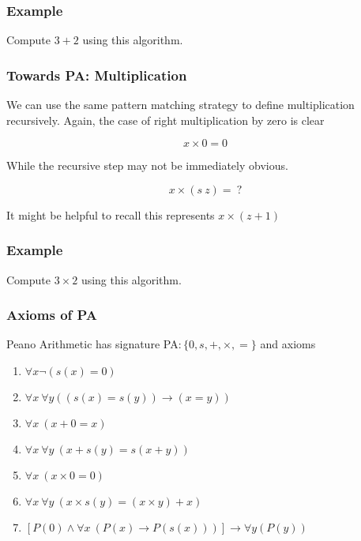 \documentclass{beamer}
\theoremstyle{indentDefn} \newtheorem{defn}[]{Definition}
\begin{document}
\begin{frame}
	\frametitle{Example}

	Compute $3 + 2$ using this algorithm. 

	\vspace{6cm}

\end{frame}

\begin{frame}
	\frametitle{Towards PA: Multiplication}

	We can use the same pattern matching strategy to define multiplication recursively. Again, the case of right multiplication by zero is clear

	$$x \times 0 = 0$$

	While the recursive step may not be immediately obvious.

	$$x \times (s \ z) = \ ?$$

	It might be helpful to recall this represents $x \times (z + 1)$

	\vspace{2cm}

\end{frame}

\begin{frame}
	\frametitle{Example}

	Compute $3 \times 2$ using this algorithm. 

	\vspace{6cm}

\end{frame} 

\begin{frame}
	\frametitle{Axioms of PA}
	
	Peano Arithmetic has signature PA$: \{0, s, +, \times, =\}$ and axioms
	
	\begin{enumerate}
		\item $\forall x \lnot(s(x) = 0)$
		\item $\forall x \ \forall y ((s(x) = s(y)) \to (x = y))$		\item $\forall x \ (x + 0 = x)$
		\item $\forall x \ \forall y \ (x + s(y) = s(x + y))$
		\item $\forall x \ (x \times 0 = 0)$
		\item $\forall x \ \forall y \ (x \times s(y) = (x \times y) + x)$
		\item $[P(0) \land \forall x \ (P(x) \to P(s(x)))] \rightarrow \forall y (P(y))$
	\end{enumerate}

\end{frame}
\end{document}
